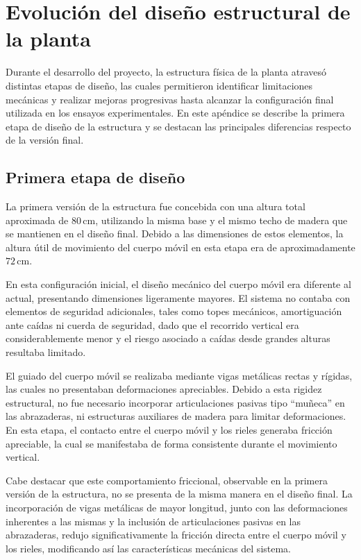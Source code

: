 \clearpage
\section{Evolución del diseño estructural de la planta}
\label{app:estructura}

Durante el desarrollo del proyecto, la estructura física de la planta atravesó distintas etapas de diseño, las cuales permitieron identificar limitaciones mecánicas y realizar mejoras progresivas hasta alcanzar la configuración final utilizada en los ensayos experimentales. En este apéndice se describe la primera etapa de diseño de la estructura y se destacan las principales diferencias respecto de la versión final.

\subsection{Primera etapa de diseño}

La primera versión de la estructura fue concebida con una altura total aproximada de \(80\,\text{cm}\), utilizando la misma base y el mismo techo de madera que se mantienen en el diseño final. Debido a las dimensiones de estos elementos, la altura útil de movimiento del cuerpo móvil en esta etapa era de aproximadamente \(72\,\text{cm}\).

En esta configuración inicial, el diseño mecánico del cuerpo móvil era diferente al actual, presentando dimensiones ligeramente mayores. El sistema no contaba con elementos de seguridad adicionales, tales como topes mecánicos, amortiguación ante caídas ni cuerda de seguridad, dado que el recorrido vertical era considerablemente menor y el riesgo asociado a caídas desde grandes alturas resultaba limitado.

El guiado del cuerpo móvil se realizaba mediante vigas metálicas rectas y rígidas, las cuales no presentaban deformaciones apreciables. Debido a esta rigidez estructural, no fue necesario incorporar articulaciones pasivas tipo ``muñeca'' en las abrazaderas, ni estructuras auxiliares de madera para limitar deformaciones. En esta etapa, el contacto entre el cuerpo móvil y los rieles generaba fricción apreciable, la cual se manifestaba de forma consistente durante el movimiento vertical.

Cabe destacar que este comportamiento friccional, observable en la primera versión de la estructura, no se presenta de la misma manera en el diseño final. La incorporación de vigas metálicas de mayor longitud, junto con las deformaciones inherentes a las mismas y la inclusión de articulaciones pasivas en las abrazaderas, redujo significativamente la fricción directa entre el cuerpo móvil y los rieles, modificando así las características mecánicas del sistema.

